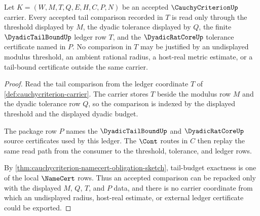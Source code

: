 \begin{theorem}
\label{thm:cauchycriterion-dyadic-tail-ledger-exactness}
Let $K=(W,M,T,Q,E,H,C,P,N)$ be an accepted $\CauchyCriterionUp$ carrier. Every accepted tail comparison recorded in $T$ is read only through the threshold displayed by $M$, the dyadic tolerance displayed by $Q$, the finite $\DyadicTailBoundUp$ ledger row $T$, and the $\DyadicRatCoreUp$ tolerance certificate named in $P$. No comparison in $T$ may be justified by an undisplayed modulus threshold, an ambient rational radius, a host-real metric estimate, or a tail-bound certificate outside the same carrier.
\end{theorem}
\begin{proof}
Read the tail comparison from the ledger coordinate $T$ of \autoref{def:cauchycriterion-carrier}. The carrier stores $T$ beside the modulus row $M$ and the dyadic tolerance row $Q$, so the comparison is indexed by the displayed threshold and the displayed dyadic budget.

The package row $P$ names the $\DyadicTailBoundUp$ and $\DyadicRatCoreUp$ source certificates used by this ledger. The $\Cont$ routes in $C$ then replay the same read path from the consumer to the threshold, tolerance, and ledger rows.

By \autoref{thm:cauchycriterion-namecert-obligation-sketch}, tail-budget exactness is one of the local $\NameCert$ rows. Thus an accepted comparison can be repacked only with the displayed $M$, $Q$, $T$, and $P$ data, and there is no carrier coordinate from which an undisplayed radius, host-real estimate, or external ledger certificate could be exported.
\end{proof}

